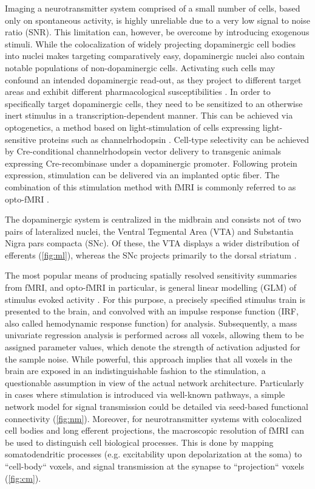 Imaging a neurotransmitter system comprised of a small number of cells, based only on spontaneous activity, is highly unreliable due to a very low signal to noise ratio (SNR).
This limitation can, however, be overcome by introducing exogenous stimuli.
While the colocalization of widely projecting dopaminergic cell bodies into nuclei makes targeting comparatively easy, dopaminergic nuclei also contain notable populations of non-dopaminergic cells.
Activating such cells may confound an intended dopaminergic read-out, as they project to different target areas and exhibit different pharmacological susceptibilities \cite{Taylor2014}.
In order to specifically target dopaminergic cells, they need to be sensitized to an otherwise inert stimulus in a transcription-dependent manner.
This can be achieved via optogenetics, a method based on light-stimulation of cells expressing light-sensitive proteins such as channelrhodopsin \cite{Boyden2005}.
Cell-type selectivity can be achieved by Cre-conditional channelrhodopsin vector delivery \cite{Orban1992} to transgenic animals expressing Cre-recombinase under a dopaminergic promoter.
Following protein expression, stimulation can be delivered via an implanted optic fiber.
The combination of this stimulation method with fMRI is commonly referred to as opto-fMRI \cite{Desai2011,Grandjean2019}.

The dopaminergic system is centralized in the midbrain and consists not of two pairs of lateralized nuclei, the Ventral Tegmental Area (VTA) and Substantia Nigra pars compacta (SNc).
Of these, the VTA displays a wider distribution of efferents (\cref{fig:ml}), whereas the SNc projects primarily to the dorsal striatum \cite{Pan2010}.

The most popular means of producing spatially resolved sensitivity summaries from fMRI, and opto-fMRI in particular, is general linear modelling (GLM) of stimulus evoked activity \cite{Friston1995}.
For this purpose, a precisely specified stimulus train is presented to the brain, and convolved with an impulse response function (IRF, also called hemodynamic response function) for analysis.
Subsequently, a mass univariate regression analysis is performed across all voxels, allowing them to be assigned parameter values, which denote the strength of activation adjusted for the sample noise.
While powerful, this approach implies that all voxels in the brain are exposed in an indistinguishable fashion to the stimulation, a questionable assumption in view of the actual network architecture.
Particularly in cases where stimulation is introduced via well-known pathways, a simple network model for signal transmission could be detailed via seed-based functional connectivity (\cref{fig:nm}).
Moreover, for neurotransmitter systems with colocalized cell bodies and long efferent projections, the macroscopic resolution of fMRI can be used to distinguish cell biological processes.
This is done by mapping somatodendritic processes (e.g. excitability upon depolarization at the soma) to “cell-body“ voxels, and signal transmission at the synapse to “projection“ voxels (\cref{fig:cm}).

